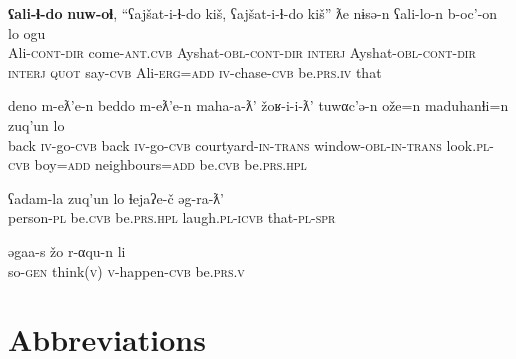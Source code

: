 \documentclass[output=paper]{LSP/langsci}
\begin{document}
\ea

\gll  \textbf{ʕali-ɬ-do} \textbf{nuw-oɬ}, “ʕajšat-i-ɬ-do kiš, ʕajšat-i-ɬ-do kiš” ƛe nɨsə-n ʕali-lo-n b-oc’-on lo ogu \\
Ali-\textsc{cont-dir} come-\textsc{ant.cvb}  Ayshat-\textsc{obl-cont-dir} \textsc{interj} Ayshat-\textsc{obl-cont-dir} \textsc{interj} \textsc{quot} say-\textsc{cvb} Ali-\textsc{erg=add} \textsc{iv}-chase-\textsc{cvb} be.\textsc{prs.iv} that  \\
\glt {}
\z

\ea

\gll  deno m-eƛ’e-n  beddo m-eƛ’e-n maha-a-ƛ’ žoʁ-i-i-ƛ’ tuwαc’ə-n ože=n maduhanɬi=n zuq’un lo\\
back \textsc{iv}-go-\textsc{cvb} back \textsc{iv}-go-\textsc{cvb} courtyard-\textsc{in-trans} window-\textsc{obl-in-trans} look.\textsc{pl-cvb} boy=\textsc{add} neighbours=\textsc{add} be.\textsc{cvb} be.\textsc{prs.hpl}  \\
\glt {}
\z

\ea

\gll  ʕadam-la zuq’un lo ɬejaʔe-č əg-ra-ƛ’\\
person-\textsc{pl} be.\textsc{cvb} be.\textsc{prs.hpl} laugh.\textsc{pl-icvb} that-\textsc{pl-spr}  \\
\glt {}
\z

\ea

\gll  əgaa-s žo r-αqu-n li\\
so-\textsc{gen} think(\textsc{v}) \textsc{v}-happen-\textsc{cvb} be.\textsc{prs.v}  \\
\glt {}
\z

\section*{Abbreviations}
\end{document}
